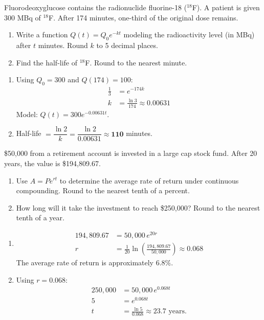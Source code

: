 \documentclass{ximera}
\begin{document}
\begin{problem}
Fluorodeoxyglucose contains the radionuclide fluorine-18 ($^{18}$F). A patient is given 300 MBq of $^{18}$F. After 174 minutes, one-third of the original dose remains.
\begin{enumerate}
  \item[(a)] Write a function $Q(t) = Q_0 e^{-kt}$ modeling the radioactivity level (in MBq) after $t$ minutes. Round $k$ to 5 decimal places.
  \medskip
  \item[(b)] Find the half-life of $^{18}$F. Round to the nearest minute.
\end{enumerate}

\begin{solution}
\begin{enumerate}
  \item[(a)] Using $Q_0=300$ and $Q(174)=100$:
  \begin{align*}
    \tfrac{1}{3} &= e^{-174k}\\
    k &= \frac{\ln 3}{174} \approx 0.00631
  \end{align*}
  Model: $Q(t) = 300e^{-0.00631t}$.

  \item[(b)] Half-life $= \dfrac{\ln 2}{k} = \dfrac{\ln 2}{0.00631} \approx \mathbf{110}$ minutes.
\end{enumerate}
\end{solution}
\end{problem}


\begin{problem}
\$50,000 from a retirement account is invested in a large cap stock fund. After 20 years, the value is \$194,809.67.
\begin{enumerate}
  \item[(a)] Use $A = Pe^{rt}$ to determine the average rate of return under continuous compounding. Round to the nearest tenth of a percent.
  \medskip
  \item[(b)] How long will it take the investment to reach \$250,000? Round to the nearest tenth of a year.
\end{enumerate}

\begin{solution}
\begin{enumerate}
  \item[(a)]
  \begin{align*}
    194{,}809.67 &= 50{,}000\,e^{20r}\\
    r &= \frac{1}{20}\ln\!\left(\frac{194{,}809.67}{50{,}000}\right) \approx 0.068
  \end{align*}
  The average rate of return is approximately $\mathbf{6.8\%}$.

  \item[(b)] Using $r=0.068$:
  \begin{align*}
    250{,}000 &= 50{,}000\,e^{0.068t}\\
    5 &= e^{0.068t}\\
    t &= \frac{\ln 5}{0.068} \approx \mathbf{23.7}\text{ years.}
  \end{align*}
\end{enumerate}
\end{solution}
\end{problem}
\end{document}
